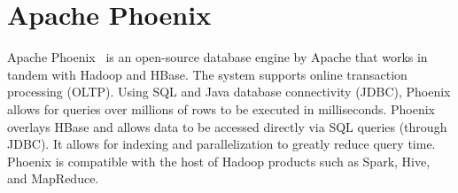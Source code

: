 \section{Apache Phoenix}

Apache Phoenix~\cite{hid-sp18-www-526-apache-phoenix} 
is an open-source database engine by Apache that works 
in tandem with Hadoop and HBase. The system supports online 
transaction  processing (OLTP). Using SQL and Java database 
connectivity (JDBC), Phoenix allows for queries over millions of rows 
to be executed in milliseconds. Phoenix overlays HBase and allows 
data to be accessed directly via SQL queries (through JDBC). It allows
for indexing and parallelization to greatly reduce query time. Phoenix
is compatible with the host of Hadoop products such as Spark, Hive, 
and MapReduce.
